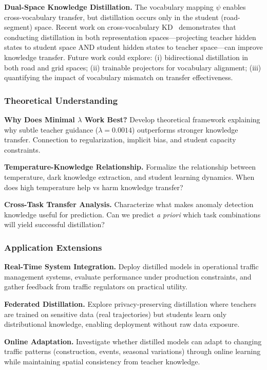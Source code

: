 \textbf{Dual-Space Knowledge Distillation.} The vocabulary mapping $\psi$ enables cross-vocabulary transfer, but distillation occurs only in the student (road-segment) space. Recent work on cross-vocabulary KD~\cite{zhangDualSpaceFrameworkGeneral2025} demonstrates that conducting distillation in both representation spaces—projecting teacher hidden states to student space AND student hidden states to teacher space—can improve knowledge transfer. Future work could explore: (i) bidirectional distillation in both road and grid spaces; (ii) trainable projectors for vocabulary alignment; (iii) quantifying the impact of vocabulary mismatch on transfer effectiveness.

\subsubsection{Theoretical Understanding}

\textbf{Why Does Minimal $\lambda$ Work Best?} Develop theoretical framework explaining why subtle teacher guidance ($\lambda = 0.0014$) outperforms stronger knowledge transfer. Connection to regularization, implicit bias, and student capacity constraints.

\textbf{Temperature-Knowledge Relationship.} Formalize the relationship between temperature, dark knowledge extraction, and student learning dynamics. When does high temperature help vs harm knowledge transfer?

\textbf{Cross-Task Transfer Analysis.} Characterize what makes anomaly detection knowledge useful for prediction. Can we predict \emph{a priori} which task combinations will yield successful distillation?

\subsubsection{Application Extensions}

\textbf{Real-Time System Integration.} Deploy distilled models in operational traffic management systems, evaluate performance under production constraints, and gather feedback from traffic regulators on practical utility.

\textbf{Federated Distillation.} Explore privacy-preserving distillation where teachers are trained on sensitive data (real trajectories) but students learn only distributional knowledge, enabling deployment without raw data exposure.

\textbf{Online Adaptation.} Investigate whether distilled models can adapt to changing traffic patterns (construction, events, seasonal variations) through online learning while maintaining spatial consistency from teacher knowledge.

